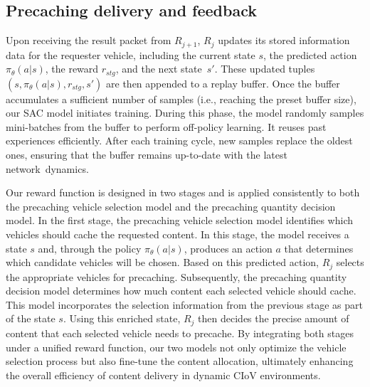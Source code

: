 \documentclass{aims}
\numberwithin{equation}{section}
\begin{document}
\subsection{Precaching delivery and feedback}
Upon receiving the result packet from $R_{j+1}$, $R_{j}$ updates its stored information data for the requester vehicle, including the current state $s$, the predicted action $\pi_{\theta}(a|s)$, the reward $r_{stg}$, and the next state~$s'$.
These updated tuples $(s, \pi_{\theta}(a|s), r_{stg}, s')$ are then appended to a replay buffer.
Once the buffer accumulates a sufficient number of samples (i.e., reaching the preset buffer size), our SAC model initiates training.
During this phase, the model randomly samples mini-batches from the buffer to perform off-policy learning.
It reuses past experiences efficiently.
After each training cycle, new samples replace the oldest ones, ensuring that the buffer remains up-to-date with the latest network~dynamics.

Our reward function is designed in two stages and is applied consistently to both the precaching vehicle selection model and the precaching quantity decision model.
In the first stage, the precaching vehicle selection model identifies which vehicles should cache the requested content.
In this stage, the model receives a state $s$ and, through the policy $\pi_{\theta}(a|s)$, produces an action $a$ that determines which candidate vehicles will be chosen.
Based on this predicted action, $R_{j}$ selects the appropriate vehicles for precaching.
Subsequently, the precaching quantity decision model determines how much content each selected vehicle should cache.
This model incorporates the selection information from the previous stage as part of the state $s$.
Using this enriched state, $R_{j}$ then decides the precise amount of content that each selected vehicle needs to precache.
By integrating both stages under a unified reward function, our two models not only optimize the vehicle selection process but also fine-tune the content allocation, ultimately enhancing the overall efficiency of content delivery in dynamic CIoV environments.
\end{document}
